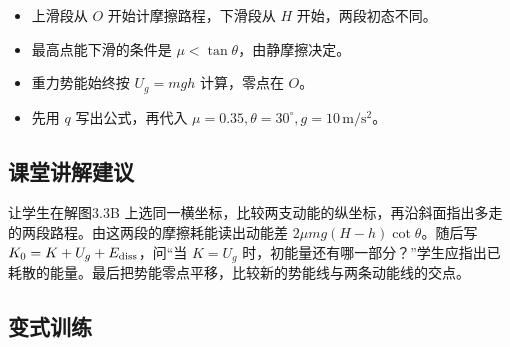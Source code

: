 \documentclass[UTF8,fontset=fandol,a4paper,11pt]{ctexart}
\begin{document}
\begin{itemize}
\item 上滑段从 $O$ 开始计摩擦路程，下滑段从 $H$ 开始，两段初态不同。
\item 最高点能下滑的条件是 $\mu<\tan\theta$，由静摩擦决定。
\item 重力势能始终按 $U_g=mgh$ 计算，零点在 $O$。
\item 先用 $q$ 写出公式，再代入 $\mu=0.35,\theta=30^\circ,g=10\,\mathrm{m/s^2}$。
\end{itemize}



\subsection*{课堂讲解建议}

让学生在解图3.3B 上选同一横坐标，比较两支动能的纵坐标，再沿斜面指出多走的两段路程。由这两段的摩擦耗能读出动能差 $2\mu mg(H-h)\cot\theta$。随后写 $K_0=K+U_g+E_{\rm diss}$，问“当 $K=U_g$ 时，初能量还有哪一部分？”学生应指出已耗散的能量。最后把势能零点平移，比较新的势能线与两条动能线的交点。



\subsection*{变式训练}
\end{document}
